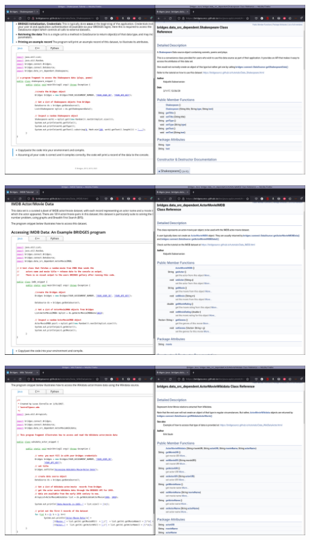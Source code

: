 \documentclass[aspectratio=169]{beamer}
\begin{document}
\begin{frame}
  \includegraphics[width=1.02\linewidth]{dataset_figs/Shakespeare.png}
\end{frame}

\begin{frame}
  \includegraphics[width=1.02\linewidth]{dataset_figs/IMDB.png}
\end{frame}

\begin{frame}
  \includegraphics[width=1.02\linewidth]{dataset_figs/WikidataActor.png}
\end{frame}
\end{document}
